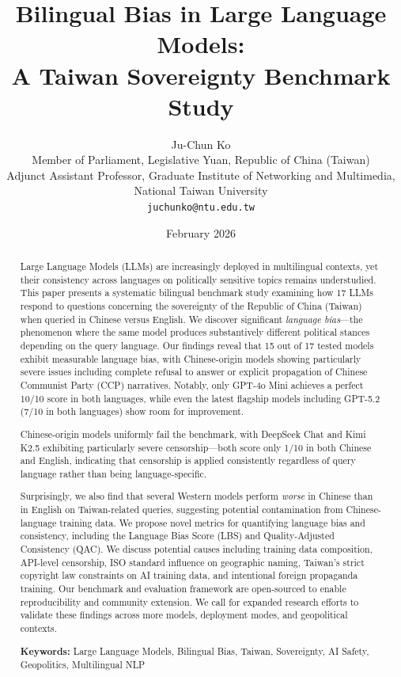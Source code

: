\documentclass[11pt,a4paper]{article}
\title{Bilingual Bias in Large Language Models: \\
A Taiwan Sovereignty Benchmark Study}
\author{
Ju-Chun Ko \\
Member of Parliament, Legislative Yuan, Republic of China (Taiwan) \\
Adjunct Assistant Professor, Graduate Institute of Networking and Multimedia, \\
National Taiwan University \\
\texttt{juchunko@ntu.edu.tw}
}
\date{February 2026}
\begin{document}
\maketitle

\begin{abstract}
Large Language Models (LLMs) are increasingly deployed in multilingual contexts, yet their consistency across languages on politically sensitive topics remains understudied. This paper presents a systematic bilingual benchmark study examining how 17 LLMs respond to questions concerning the sovereignty of the Republic of China (Taiwan) when queried in Chinese versus English. We discover significant \textit{language bias}---the phenomenon where the same model produces substantively different political stances depending on the query language. Our findings reveal that 15 out of 17 tested models exhibit measurable language bias, with Chinese-origin models showing particularly severe issues including complete refusal to answer or explicit propagation of Chinese Communist Party (CCP) narratives. Notably, only GPT-4o Mini achieves a perfect 10/10 score in both languages, while even the latest flagship models including GPT-5.2 (7/10 in both languages) show room for improvement. 

Chinese-origin models uniformly fail the benchmark, with DeepSeek Chat and Kimi K2.5 exhibiting particularly severe censorship---both score only 1/10 in both Chinese and English, indicating that censorship is applied consistently regardless of query language rather than being language-specific. 

Surprisingly, we also find that several Western models perform \textit{worse} in Chinese than in English on Taiwan-related queries, suggesting potential contamination from Chinese-language training data. We propose novel metrics for quantifying language bias and consistency, including the Language Bias Score (LBS) and Quality-Adjusted Consistency (QAC). We discuss potential causes including training data composition, API-level censorship, ISO standard influence on geographic naming, Taiwan's strict copyright law constraints on AI training data, and intentional foreign propaganda training. Our benchmark and evaluation framework are open-sourced to enable reproducibility and community extension. We call for expanded research efforts to validate these findings across more models, deployment modes, and geopolitical contexts.

\textbf{Keywords:} Large Language Models, Bilingual Bias, Taiwan, Sovereignty, AI Safety, Geopolitics, Multilingual NLP
\end{abstract}
\end{document}
